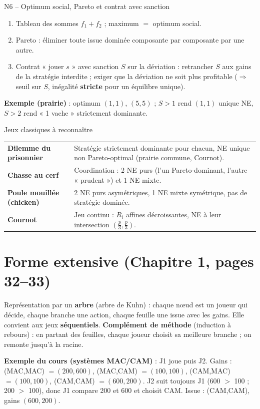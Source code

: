 \documentclass[11pt,a4paper]{article}
\begin{document}
\begin{methbox}{N6 -- Optimum social, Pareto et contrat avec sanction}
\begin{enumerate}[leftmargin=*]
\item Tableau des sommes $f_1+f_2$ ; maximum $=$ optimum social.
\item Pareto : éliminer toute issue dominée composante par composante par une autre.
\item Contrat « jouer $s$ » avec sanction $S$ sur la déviation : retrancher $S$ aux gains de la stratégie interdite ; exiger que la déviation ne soit plus profitable ($\Rightarrow$ seuil sur $S$, inégalité \textbf{stricte} pour un équilibre unique).
\end{enumerate}
\textbf{Exemple (prairie)} : optimum $(1,1)$, $(5,5)$ ; $S>1$ rend $(1,1)$ unique NE, $S>2$ rend « 1 vache » strictement dominante.
\end{methbox}

\begin{rembox}{Jeux classiques à reconnaître}
\begin{tabular}{p{3.2cm}p{11cm}}
\textbf{Dilemme du prisonnier} & Stratégie strictement dominante pour chacun, NE unique non Pareto-optimal (prairie commune, Cournot). \\
\textbf{Chasse au cerf} & Coordination : 2 NE purs (l'un Pareto-dominant, l'autre « prudent ») et 1 NE mixte. \\
\textbf{Poule mouillée (chicken)} & 2 NE purs asymétriques, 1 NE mixte symétrique, pas de stratégie dominée. \\
\textbf{Cournot} & Jeu continu : $R_i$ affines décroissantes, NE à leur intersection $(\frac p3,\frac p3)$.
\end{tabular}
\end{rembox}

\section{Forme extensive (Chapitre 1, pages 32--33)}\label{sec:extensive}
Représentation par un \textbf{arbre} (arbre de Kuhn) : chaque nœud est un joueur qui décide, chaque branche une action, chaque feuille une issue avec les gains. Elle convient aux jeux \textbf{séquentiels}. \textbf{Complément de méthode} (induction à rebours) : en partant des feuilles, chaque joueur choisit sa meilleure branche ; on remonte jusqu'à la racine.

\textbf{Exemple du cours (systèmes MAC/CAM)} : J1 joue puis J2. Gains : (MAC,MAC) $=(200,600)$, (MAC,CAM) $=(100,100)$, (CAM,MAC) $=(100,100)$, (CAM,CAM) $=(600,200)$. J2 suit toujours J1 (600 $>$ 100 ; 200 $>$ 100), donc J1 compare 200 et 600 et choisit CAM. Issue : (CAM,CAM), gains $(600,200)$.
\end{document}

